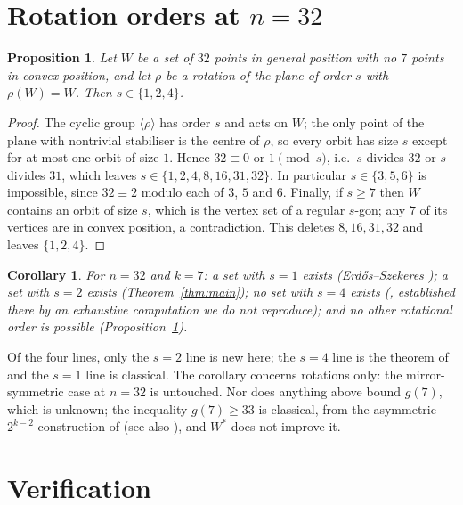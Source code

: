 \documentclass[11pt]{amsart}
\newtheorem{proposition}[theorem]{Proposition}
\newtheorem{corollary}[theorem]{Corollary}
\theoremstyle{remark}
\begin{document}
\section{Rotation orders at $n=32$}\label{sec:complete}

\begin{proposition}\label{prop:orders}
Let $W$ be a set of $32$ points in general position with no $7$ points in
convex position, and let $\rho$ be a rotation of the plane of order $s$ with
$\rho(W)=W$. Then $s\in\{1,2,4\}$.
\end{proposition}

\begin{proof}
The cyclic group $\langle\rho\rangle$ has order $s$ and acts on $W$; the only
point of the plane with nontrivial stabiliser is the centre of $\rho$, so every
orbit has size $s$ except for at most one orbit of size $1$. Hence
$32\equiv 0$ or $1 \pmod s$, i.e.\ $s$ divides $32$ or $s$ divides $31$, which
leaves $s\in\{1,2,4,8,16,31,32\}$. In particular $s\in\{3,5,6\}$ is impossible,
since $32\equiv 2$ modulo each of $3$, $5$ and $6$. Finally, if $s\ge 7$ then
$W$ contains an orbit of size $s$, which is the vertex set of a regular
$s$-gon; any $7$ of its vertices are in convex position, a contradiction. This
deletes $8,16,31,32$ and leaves $\{1,2,4\}$.
\end{proof}

\begin{corollary}\label{cor:complete}
For $n=32$ and $k=7$: a set with $s=1$ exists (Erd\H{o}s--Szekeres
\cite{ES61}); a set with $s=2$ exists (Theorem~\ref{thm:main}); no set with
$s=4$ exists (\cite{SMQH}, established there by an exhaustive computation we do
not reproduce); and no other rotational order is possible
(Proposition~\ref{prop:orders}).
\end{corollary}

\noindent
Of the four lines, only the $s=2$ line is new here; the $s=4$ line is the
theorem of \cite{SMQH} and the $s=1$ line is classical. The corollary concerns
rotations only: the mirror-symmetric case at $n=32$ is untouched. Nor does
anything above bound $g(7)$, which is unknown; the inequality $g(7)\ge 33$ is
classical, from the asymmetric $2^{k-2}$ construction of \cite{ES61} (see also
\cite[Thm.~2.6]{MorrisSoltan}), and $W^{*}$ does not improve it.

\section{Verification}\label{sec:verify}
\end{document}
